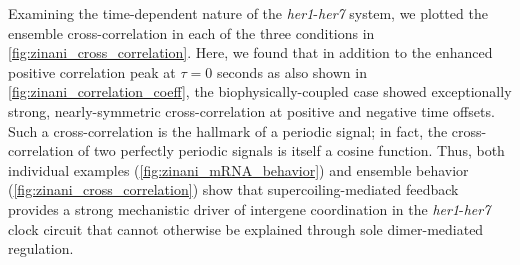 \documentclass[11pt]{article}
\begin{document}
Examining the time-dependent nature of the \textit{her1}-\textit{her7} system, we plotted the ensemble cross-correlation in each of the three conditions in \cref{fig:zinani_cross_correlation}. Here, we found that in addition to the enhanced positive correlation peak at \(\tau = 0\) seconds as also shown in \cref{fig:zinani_correlation_coeff}, the biophysically-coupled case showed exceptionally strong, nearly-symmetric cross-correlation at positive and negative time offsets. Such a cross-correlation is the hallmark of a periodic signal; in fact, the cross-correlation of two perfectly periodic signals is itself a cosine function. Thus, both individual examples (\cref{fig:zinani_mRNA_behavior}) and ensemble behavior (\cref{fig:zinani_cross_correlation}) show that supercoiling-mediated feedback provides a strong mechanistic driver of intergene coordination in the \textit{her1}-\textit{her7} clock circuit that cannot otherwise be explained through sole dimer-mediated regulation.
\end{document}
